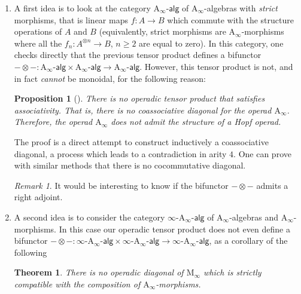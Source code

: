 \documentclass[twoside, 12pt]{amsart}
\newtheorem{proposition}[definition]{Proposition}
\newtheorem{theorem}{Theorem}
\theoremstyle{remark}
\newtheorem{remark}[definition]{\sc Remark}
\newcommand{\Ainf}{\mathrm{A}_\infty} %
\newcommand{\Minf}{\mathrm{M}_\infty} %
\newcommand{\Aalg}{\ensuremath{\mathrm{A}_\infty\text{-}\mathsf{alg}}} %
\newcommand{\infAalg}{\ensuremath{\infty\text{-}\mathrm{A}_\infty\text{-}\mathsf{alg}}} %
\begin{document}
\begin{enumerate}[leftmargin=*, itemsep=0.5em]
\item A first idea is to look at the category $\Aalg$ of $\Ainf$-algebras with \emph{strict} morphisms, that is linear maps $f : A \to B$ which commute with the structure operations of $A$ and $B$ (equivalently, strict morphisms are $\Ainf$-morphisms where all the $f_n: A^{\otimes n} \to B$, $n\geq 2$ are equal to zero). 
In this category, one checks directly that the previous tensor product defines a bifunctor $ - \otimes - : \Aalg \times \Aalg \to \Aalg$. 
However, this tensor product is not, and in fact \emph{cannot} be monoidal, for the following reason:
\begin{proposition}[{\cite[Theorem 13]{MarklShnider06}}]
  \label{prop:nocoassoc}
  There is no operadic tensor product that satisfies associativity.
  That is, there is no coassociative diagonal for the operad $\Ainf$. Therefore, the operad $\Ainf$ does not admit the structure of a Hopf operad.  
\end{proposition} 
The proof is a direct attempt to construct inductively a coassociative diagonal, a process which leads to a contradiction in arity $4$.
One can prove with similar methods that there is no cocommutative diagonal.

\begin{remark}
It would be interesting to know if the bifunctor $ - \otimes -$ admits a right adjoint. 
\end{remark}

\item A second idea is to consider the category $\infAalg$ of $\Ainf$-algebras and $\Ainf$-morphisms. 
In this case our operadic tensor product does not even define a bifunctor $ - \otimes - : \infAalg \times \infAalg \to \infAalg$, as a corollary of the following
\begin{theorem} 
  \label{thm:nofunctorial}
  There is no operadic diagonal of $\Minf$ which is strictly compatible with the composition of $\Ainf$-morphisms. 
\end{theorem}


\end{enumerate}
\end{document}
